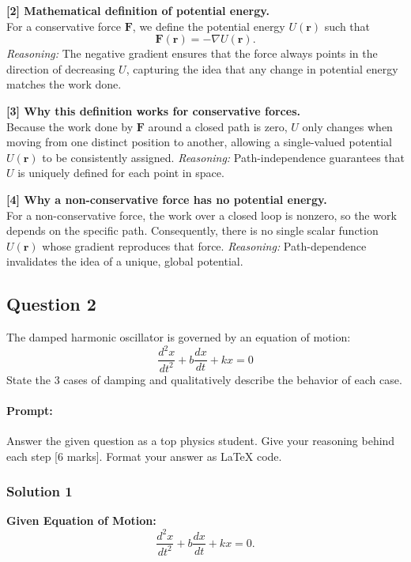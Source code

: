 \documentclass{article}
\begin{document}
\textbf{[2] Mathematical definition of potential energy.}\\
For a conservative force $\mathbf{F}$, we define the potential energy $U(\mathbf{r})$ such that 
\[
\mathbf{F}(\mathbf{r}) = -\nabla U(\mathbf{r}).
\]
\emph{Reasoning:} The negative gradient ensures that the force always points in the direction of decreasing $U$, capturing the idea that any change in potential energy matches the work done.

\textbf{[3] Why this definition works for conservative forces.}\\
Because the work done by $\mathbf{F}$ around a closed path is zero, $U$ only changes when moving from one distinct position to another, allowing a single-valued potential $U(\mathbf{r})$ to be consistently assigned.
\emph{Reasoning:} Path-independence guarantees that $U$ is uniquely defined for each point in space.

\textbf{[4] Why a non-conservative force has no potential energy.}\\
For a non-conservative force, the work over a closed loop is nonzero, so the work depends on the specific path. Consequently, there is no single scalar function $U(\mathbf{r})$ whose gradient reproduces that force.
\emph{Reasoning:} Path-dependence invalidates the idea of a unique, global potential.


\subsection{Question 2}

The damped harmonic oscillator is governed by an equation of motion:
\[
\frac{d^2x}{dt^2} + b\frac{dx}{dt} + kx = 0
\] 
State the 3 cases of damping and qualitatively describe the behavior of each case.

\paragraph{Prompt: \\} 
Answer the given question as a top physics student. Give your reasoning behind each step [6 marks].
Format your answer as LaTeX code.

\subsubsection{Solution 1}

\noindent
\textbf{Given Equation of Motion:}
\[
\frac{d^2 x}{dt^2} + b \frac{dx}{dt} + k x = 0.
\]
\end{document}
